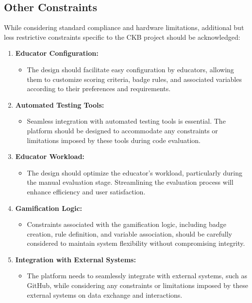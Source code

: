 \subsection{Other Constraints}
While considering standard compliance and hardware limitations, additional but less restrictive constraints specific to the CKB project should be acknowledged:

\begin{enumerate}
    \item \textbf{Educator Configuration:}
          \begin{itemize}
              \item The design should facilitate easy configuration by educators, allowing them to customize scoring criteria, badge rules, and associated variables according to their preferences and requirements.
          \end{itemize}

    \item \textbf{Automated Testing Tools:}
          \begin{itemize}
              \item Seamless integration with automated testing tools is essential. The platform should be designed to accommodate any constraints or limitations imposed by these tools during code evaluation.
          \end{itemize}

    \item \textbf{Educator Workload:}
          \begin{itemize}
              \item The design should optimize the educator's workload, particularly during the manual evaluation stage. Streamlining the evaluation process will enhance efficiency and user satisfaction.
          \end{itemize}

    \item \textbf{Gamification Logic:}
          \begin{itemize}
              \item Constraints associated with the gamification logic, including badge creation, rule definition, and variable association, should be carefully considered to maintain system flexibility without compromising integrity.
          \end{itemize}

    \item \textbf{Integration with External Systems:}
          \begin{itemize}
              \item The platform needs to seamlessly integrate with external systems, such as GitHub, while considering any constraints or limitations imposed by these external systems on data exchange and interactions.
          \end{itemize}
\end{enumerate}

